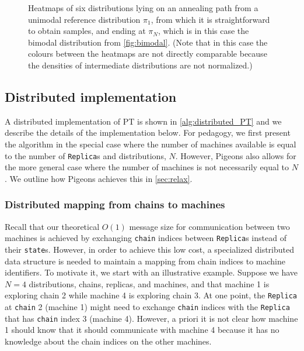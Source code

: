 \begin{figure}[t]
\begin{minipage}{0.15\textwidth}
      \caption*{$\pi_6$}
    \end{minipage}
    \caption{Heatmaps of six distributions lying on an annealing path 
    from a unimodal reference distribution  
    $\pi_1$, from which it is straightforward to obtain samples, and ending at 
    $\pi_N$, which is in this case the bimodal distribution from 
    \cref{fig:bimodal}. (Note that in this case the colours between the heatmaps 
    are not directly comparable because the densities of intermediate distributions 
    are not normalized.)}
    \label{fig:path}
\end{figure}



\subsection{Distributed implementation}
A distributed implementation of PT is shown in \cref{alg:distributed_PT}
and we describe the details of the implementation below.
For pedagogy, we first present the algorithm in the special case where the number of machines available 
is equal to the number of \texttt{Replica}s and distributions, $N$. 
However, Pigeons also allows for the more general case where the number of 
machines is not necessarily equal to $N$.
We outline how Pigeons achieves this in \cref{sec:relax}.


\subsubsection{Distributed mapping from chains to machines}
\label{sec:permuted_dist_array}
Recall that our theoretical $O(1)$ message size for communication between two machines 
is achieved by exchanging \texttt{chain} indices between \texttt{Replica}s 
instead of their \texttt{state}s. 
However, in order to achieve this low cost, a specialized distributed data structure is 
needed to maintain a mapping from chain indices to machine identifiers. 
To motivate it, we start with an illustrative example. 
Suppose we have $N=4$ distributions, chains, replicas, and machines, and that 
machine 1 is exploring chain 2 while machine 4 is exploring chain 3.
At one point, the \texttt{Replica} at \texttt{chain} 2 (machine 1) might need to exchange
\texttt{chain} indices with the \texttt{Replica} that has \texttt{chain} index 3 (machine 4). 
However, a priori it is not clear how machine 1 should know that it should communicate 
with machine 4 because it has no knowledge about the chain indices on the other machines.

